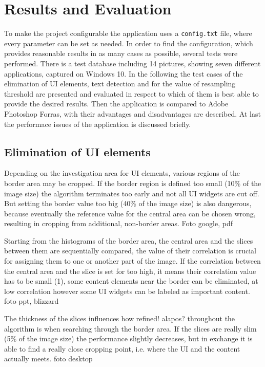 \documentclass[draft,final]{vutinfth} %
\begin{document}
	\chapter{Results and Evaluation}
	To make the project configurable the application uses a \texttt{config.txt} file, where every parameter can be set as needed.
	In order to find the configuration, which provides reasonable results in as many cases as possible, several tests were performed.
	There is a test database including 14 pictures, showing seven different applications, captured on Windows 10.
	In the following the test cases of the elimination of UI elements, text detection and for the value of resampling threshold are presented and evaluated in respect to which of them is best able to provide the desired results.
	Then the application is compared to Adobe Photoshop Forras, with their advantages and disadvantages are described.
	At last the performace issues of the application is discussed briefly.
	\section{Elimination of UI elements} 
	Depending on the investigation area for UI elements, various regions of the border area may be cropped. 
	If the border region is defined too small (10\% of the image size) the algorithm terminates too early and not all UI widgets are cut off.
	But setting the border value too big (40\% of the image size) is also dangerous, because eventually the reference value for the central area can be chosen wrong, resulting in cropping from additional, non-border areas.
	Foto google, pdf \par 
	Starting from the histograms of the border area, the central area and the slices between them are sequentially compared, the value of their correlation is crucial for assigning them to one or another part of the image.
	If the correlation between the central area and the slice is set for too high, it means their correlation value has to be small (1), some content elements near the border can be eliminated, at low correlation however some UI widgets can be labeled as important content. 
	foto ppt, blizzard\par 
	The thickness of the slices influences how refined! alapos? throughout the algorithm is when searching through the border area.
	If the slices are really slim (5\% of the image size) the performance slightly decreases, but in exchange it is able to find a really close cropping point, i.e. where the UI and the content actually meets.
	foto desktop\par
\end{document}
